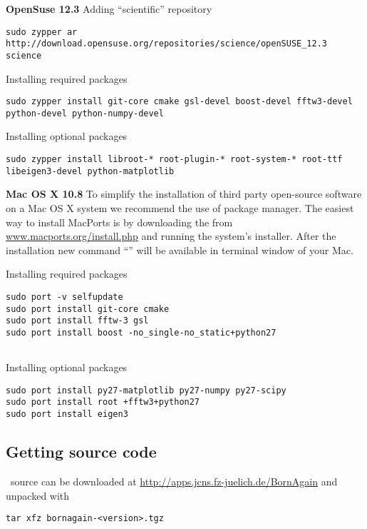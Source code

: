 \noindent
{\large\bf OpenSuse 12.3} \newline
Adding ``scientific'' repository 
\begin{lstlisting}[language=shell, style=commandline]
sudo zypper ar http://download.opensuse.org/repositories/science/openSUSE_12.3 science
\end{lstlisting}

\noindent
Installing required packages
\begin{lstlisting}[language=shell, style=commandline]
sudo zypper install git-core cmake gsl-devel boost-devel fftw3-devel python-devel python-numpy-devel
\end{lstlisting}

\noindent
Installing optional packages
\begin{lstlisting}[language=shell, style=commandline]
sudo zypper install libroot-* root-plugin-* root-system-* root-ttf libeigen3-devel python-matplotlib
\end{lstlisting}
\vspace*{3mm}



\noindent
\noindent
{\large\bf Mac OS X 10.8} \newline
To simplify the installation of third party open-source software on a Mac OS X system we recommend the use of  package manager. 
The easiest way to install MacPorts is by downloading the  
from \url{www.macports.org/install.php} and running the system's installer.
After the installation new command ``'' will be available in terminal window of your Mac. \

\noindent
Installing required packages
\begin{lstlisting}[language=shell, style=commandline]
sudo port -v selfupdate
sudo port install git-core cmake
sudo port install fftw-3 gsl
sudo port install boost -no_single-no_static+python27 


\end{lstlisting}

\noindent
Installing optional packages
\begin{lstlisting}[language=shell, style=commandline]
sudo port install py27-matplotlib py27-numpy py27-scipy
sudo port install root +fftw3+python27
sudo port install eigen3
\end{lstlisting}




\subsection{Getting source code}
\BornAgain\ source can be downloaded at \url{http://apps.jcns.fz-juelich.de/BornAgain}
and unpacked with
\begin{lstlisting}[language=shell, style=commandline]
tar xfz bornagain-<version>.tgz
\end{lstlisting}

